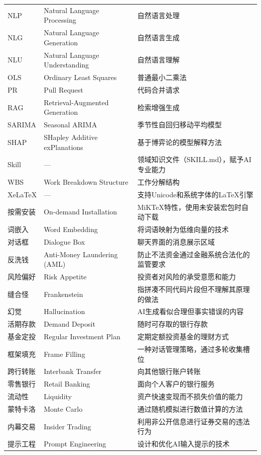 \begin{table}[H]
\begin{longtable}{lp{2.5cm}p{7cm}}
NLP & Natural Language Processing & 自然语言处理 \\
NLG & Natural Language Generation & 自然语言生成 \\
NLU & Natural Language Understanding & 自然语言理解 \\
OLS & Ordinary Least Squares & 普通最小二乘法 \\
PR & Pull Request & 代码合并请求 \\
RAG & Retrieval-Augmented Generation & 检索增强生成 \\
SARIMA & Seasonal ARIMA & 季节性自回归移动平均模型 \\
SHAP & SHapley Additive exPlanations & 基于博弈论的模型解释方法 \\
Skill & --- & 领域知识文件（SKILL.md），赋予AI专业能力 \\
WBS & Work Breakdown Structure & 工作分解结构 \\
XeLaTeX & --- & 支持Unicode和系统字体的LaTeX引擎 \\
按需安装 & On-demand Installation & MiKTeX特性，使用未安装宏包时自动下载 \\
词嵌入 & Word Embedding & 将词语映射为低维向量的技术 \\
对话框 & Dialogue Box & 聊天界面的消息展示区域 \\
反洗钱 & Anti-Money Laundering (AML) & 防止不法资金通过金融系统合法化的监管要求 \\
风险偏好 & Risk Appetite & 投资者对风险的承受意愿和能力 \\
缝合怪 & Frankenstein & 指拼凑不同代码片段但不理解其原理的做法 \\
幻觉 & Hallucination & AI生成看似合理但事实错误的内容 \\
活期存款 & Demand Deposit & 随时可存取的银行存款 \\
基金定投 & Regular Investment Plan & 定期定额投资基金的理财方式 \\
框架填充 & Frame Filling & 一种对话管理策略，通过多轮收集槽位 \\
跨行转账 & Interbank Transfer & 向其他银行账户转账 \\
零售银行 & Retail Banking & 面向个人客户的银行服务 \\
流动性 & Liquidity & 资产快速变现而不损失价值的能力 \\
蒙特卡洛 & Monte Carlo & 通过随机模拟进行数值计算的方法 \\
内幕交易 & Insider Trading & 利用非公开信息进行证券交易的违法行为 \\
提示工程 & Prompt Engineering & 设计和优化AI输入提示的技术 \\

\end{longtable}
\end{table}
